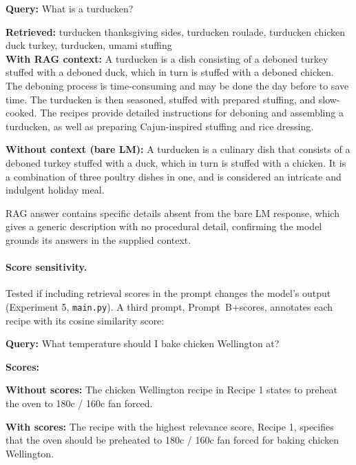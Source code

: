 \documentclass[a4paper,11pt]{article}
\begin{document}
\begin{tcolorbox}[title=grounding check, fontupper=\raggedright, breakable]
\textbf{Query:} {\small\ttfamily What is a turducken?}

\textbf{Retrieved:} {\small\ttfamily turducken thanksgiving sides, turducken roulade, turducken chicken duck turkey, turducken, umami stuffing}
\newpage
\textbf{\\With RAG context:} {\small\ttfamily A turducken is a dish consisting of a deboned turkey stuffed with a deboned duck, which in turn is stuffed with a deboned chicken. The deboning process is time-consuming and may be done the day before to save time. The turducken is then seasoned, stuffed with prepared stuffing, and slow-cooked. The recipes provide detailed instructions for deboning and assembling a turducken, as well as preparing Cajun-inspired stuffing and rice dressing.}

\textbf{Without context (bare LM):} {\small\ttfamily A turducken is a culinary dish that consists of a deboned turkey stuffed with a duck, which in turn is stuffed with a chicken. It is a combination of three poultry dishes in one, and is considered an intricate and indulgent holiday meal.}
\end{tcolorbox}

RAG answer contains specific details absent from the bare LM response, which gives a generic description with no procedural detail, confirming the model grounds its answers in the supplied context.

\paragraph{Score sensitivity.}
Tested if including retrieval scores in the prompt changes the model's output (Experiment 5, \texttt{main.py}). A third prompt, Prompt~B+scores, annotates each recipe with its cosine similarity score:

\begin{tcolorbox}[title=score sensitivity, fontupper=\raggedright, breakable]
\textbf{Query:} {\small\ttfamily What temperature should I bake chicken Wellington at?}

\textbf{Scores:} {\small\ttfamily [0.362, 0.341, 0.315, 0.302, 0.291]}

\textbf{Without scores:} {\small\ttfamily The chicken Wellington recipe in Recipe 1 states to preheat the oven to 180c / 160c fan forced.}

\textbf{With scores:} {\small\ttfamily The recipe with the highest relevance score, Recipe 1, specifies that the oven should be preheated to 180c / 160c fan forced for baking chicken Wellington.}
\end{tcolorbox}
\end{document}

